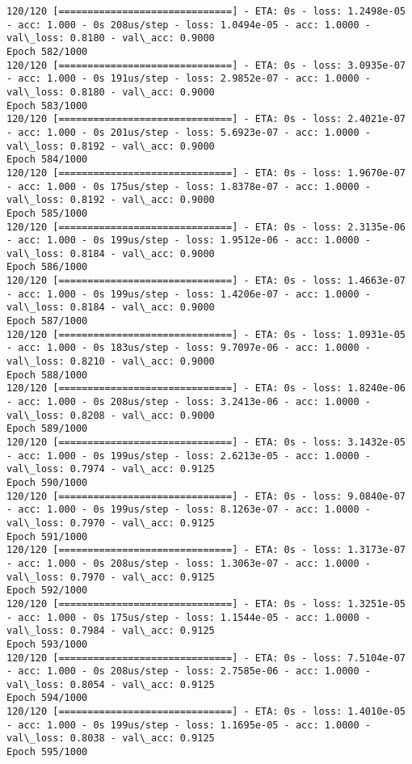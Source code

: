 \documentclass[11pt]{article}
\begin{document}
\begin{Verbatim}[commandchars=\\\{\}]
120/120 [==============================] - ETA: 0s - loss: 1.2498e-05 - acc: 1.000 - 0s 208us/step - loss: 1.0494e-05 - acc: 1.0000 - val\_loss: 0.8180 - val\_acc: 0.9000
Epoch 582/1000
120/120 [==============================] - ETA: 0s - loss: 3.0935e-07 - acc: 1.000 - 0s 191us/step - loss: 2.9852e-07 - acc: 1.0000 - val\_loss: 0.8180 - val\_acc: 0.9000
Epoch 583/1000
120/120 [==============================] - ETA: 0s - loss: 2.4021e-07 - acc: 1.000 - 0s 201us/step - loss: 5.6923e-07 - acc: 1.0000 - val\_loss: 0.8192 - val\_acc: 0.9000
Epoch 584/1000
120/120 [==============================] - ETA: 0s - loss: 1.9670e-07 - acc: 1.000 - 0s 175us/step - loss: 1.8378e-07 - acc: 1.0000 - val\_loss: 0.8192 - val\_acc: 0.9000
Epoch 585/1000
120/120 [==============================] - ETA: 0s - loss: 2.3135e-06 - acc: 1.000 - 0s 199us/step - loss: 1.9512e-06 - acc: 1.0000 - val\_loss: 0.8184 - val\_acc: 0.9000
Epoch 586/1000
120/120 [==============================] - ETA: 0s - loss: 1.4663e-07 - acc: 1.000 - 0s 199us/step - loss: 1.4206e-07 - acc: 1.0000 - val\_loss: 0.8184 - val\_acc: 0.9000
Epoch 587/1000
120/120 [==============================] - ETA: 0s - loss: 1.0931e-05 - acc: 1.000 - 0s 183us/step - loss: 9.7097e-06 - acc: 1.0000 - val\_loss: 0.8210 - val\_acc: 0.9000
Epoch 588/1000
120/120 [==============================] - ETA: 0s - loss: 1.8240e-06 - acc: 1.000 - 0s 208us/step - loss: 3.2413e-06 - acc: 1.0000 - val\_loss: 0.8208 - val\_acc: 0.9000
Epoch 589/1000
120/120 [==============================] - ETA: 0s - loss: 3.1432e-05 - acc: 1.000 - 0s 199us/step - loss: 2.6213e-05 - acc: 1.0000 - val\_loss: 0.7974 - val\_acc: 0.9125
Epoch 590/1000
120/120 [==============================] - ETA: 0s - loss: 9.0840e-07 - acc: 1.000 - 0s 199us/step - loss: 8.1263e-07 - acc: 1.0000 - val\_loss: 0.7970 - val\_acc: 0.9125
Epoch 591/1000
120/120 [==============================] - ETA: 0s - loss: 1.3173e-07 - acc: 1.000 - 0s 208us/step - loss: 1.3063e-07 - acc: 1.0000 - val\_loss: 0.7970 - val\_acc: 0.9125
Epoch 592/1000
120/120 [==============================] - ETA: 0s - loss: 1.3251e-05 - acc: 1.000 - 0s 175us/step - loss: 1.1544e-05 - acc: 1.0000 - val\_loss: 0.7984 - val\_acc: 0.9125
Epoch 593/1000
120/120 [==============================] - ETA: 0s - loss: 7.5104e-07 - acc: 1.000 - 0s 208us/step - loss: 2.7585e-06 - acc: 1.0000 - val\_loss: 0.8054 - val\_acc: 0.9125
Epoch 594/1000
120/120 [==============================] - ETA: 0s - loss: 1.4010e-05 - acc: 1.000 - 0s 199us/step - loss: 1.1695e-05 - acc: 1.0000 - val\_loss: 0.8038 - val\_acc: 0.9125
Epoch 595/1000

\end{Verbatim}
\end{document}
